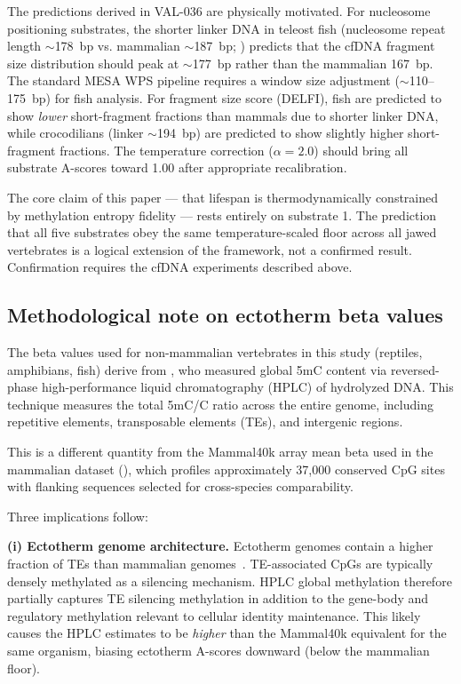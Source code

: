 \documentclass[11pt,a4paper]{article}
\begin{document}
The predictions derived in VAL-036 are physically motivated. For nucleosome
positioning substrates, the shorter linker DNA in teleost fish (nucleosome
repeat length $\sim$178~bp vs. mammalian $\sim$187~bp;
\citealt{Drew1985,Bhanu2018}) predicts that the cfDNA fragment size distribution
should peak at $\sim$177~bp rather than the mammalian 167~bp. The standard
MESA WPS pipeline requires a window size adjustment ($\sim$110--175~bp) for fish
analysis. For fragment size score (DELFI), fish are predicted to show
\emph{lower} short-fragment fractions than mammals due to shorter linker DNA,
while crocodilians (linker $\sim$194~bp) are predicted to show slightly higher
short-fragment fractions. The temperature correction ($\alpha = 2.0$) should
bring all substrate A-scores toward 1.00 after appropriate recalibration.

The core claim of this paper --- that lifespan is thermodynamically constrained
by methylation entropy fidelity --- rests entirely on substrate 1. The prediction
that all five substrates obey the same temperature-scaled floor across all jawed
vertebrates is a logical extension of the framework, not a confirmed result.
Confirmation requires the cfDNA experiments described above.

\subsection{Methodological note on ectotherm beta values}
\label{sec:caveat}

The beta values used for non-mammalian vertebrates in this study (reptiles,
amphibians, fish) derive from \citet{Varriale2006_fish,Varriale2006_reptile},
who measured global 5mC content via reversed-phase high-performance liquid
chromatography (HPLC) of hydrolyzed DNA. This technique measures the total
5mC/C ratio across the entire genome, including repetitive elements,
transposable elements (TEs), and intergenic regions.

This is a different quantity from the Mammal40k array mean beta used in the
mammalian dataset (\citealt{Lowe2018,Lu2023,Wang2020}), which profiles
approximately 37,000 conserved CpG sites with flanking sequences
selected for cross-species comparability.

Three implications follow:

\textbf{(i) Ectotherm genome architecture.} Ectotherm genomes contain a higher
fraction of TEs than mammalian genomes~\citep{Canapa2015}. TE-associated CpGs
are typically densely methylated as a silencing mechanism. HPLC global methylation
therefore partially captures TE silencing methylation in addition to the gene-body
and regulatory methylation relevant to cellular identity maintenance. This likely
causes the HPLC estimates to be \emph{higher} than the Mammal40k equivalent for
the same organism, biasing ectotherm A-scores downward (below the mammalian floor).
\end{document}
